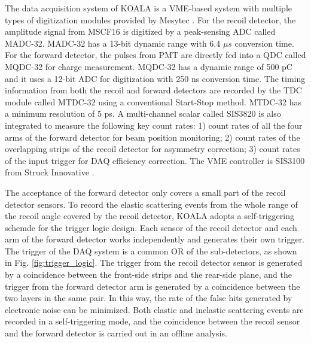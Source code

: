 \documentclass[number,5p]{elsarticle}
\begin{document}
The data acquisition system of KOALA is a VME-based system with multiple types
of digitization modules provided by Mesytec \cite{mesytec}.
For the recoil detector, the amplitude signal from MSCF16 is digitized by a peak-sensing ADC called MADC-32.
MADC-32 has a 13-bit dynamic range with 6.4 \(\mu s\) conversion time.
For the forward detector, the pulses from PMT are directly fed into a QDC called MQDC-32 for charge measurement.
MQDC-32 has a dynamic range of 500 pC and it uses a 12-bit ADC for digitization with 250 ns conversion time.
The timing information from both the recoil and forward detectors are recorded by the TDC module called MTDC-32 using a conventional Start-Stop method.
MTDC-32 has a minimum resolution of 5 ps.
A multi-channel scalar called SIS3820 \cite{sis} is also integrated to measure the following key count rates: 1) count rates of all the four arms of the forward detector for 
beam position monitoring; 2) count rates of the overlapping strips of the recoil detector for asymmetry correction; 3) count rates of the input trigger
for DAQ efficiency correction.
The VME controller is SIS3100 from Struck Innovative \cite{sis}.

The acceptance of the forward detector only covers a small part of the recoil detector sensors.
To record the elastic scattering events from the whole range of the recoil angle covered by the recoil detector, KOALA adopts a self-triggering schemde for the trigger logic design.
Each sensor of the recoil detector and each arm of the forward detector works independently and generates their own trigger. 
The trigger of the DAQ system is a common OR of the sub-detectors, as shown in Fig. \ref{fig:trigger_logic}.
The trigger from the recoil detector sensor is generated by a coincidence between the front-side strips and the rear-side plane, 
and the trigger from the forward detector arm is generated by a coincidence between the two layers in the same pair.
In this way, the rate of the false hits generated by electronic noise can be minimized.
Both elastic and inelastic scattering events are recorded in a self-triggering mode, and the coincidence between the recoil sensor and the forward detector is carried out in an offline analysis.
\end{document}
